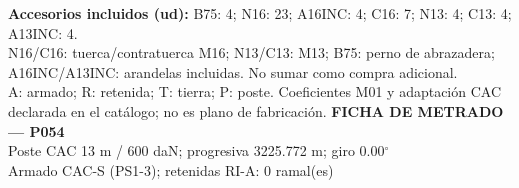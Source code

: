 \begingroup\scriptsize
\textbf{Accesorios incluidos (ud):} B75: 4; N16: 23; A16INC: 4; C16: 7; N13: 4; C13: 4; A13INC: 4.\\
N16/C16: tuerca/contratuerca M16; N13/C13: M13; B75: perno de abrazadera; A16INC/A13INC: arandelas incluidas. No sumar como compra adicional.\\
A: armado; R: retenida; T: tierra; P: poste. Coeficientes M01 y adaptación CAC declarada en el catálogo; no es plano de fabricación.
\endgroup\endgroup
\clearpage{}
\begingroup\small\setlength{\parskip}{3pt}\renewcommand{\arraystretch}{1.05}
\textbf{\large FICHA DE METRADO — P054}\\[4pt]
Poste CAC 13 m / 600 daN; progresiva 3225.772 m; giro 0.00\ensuremath{^\circ}\\
Armado CAC-S (PS1-3); retenidas RI-A: 0 ramal(es)\\
\begingroup\scriptsize
